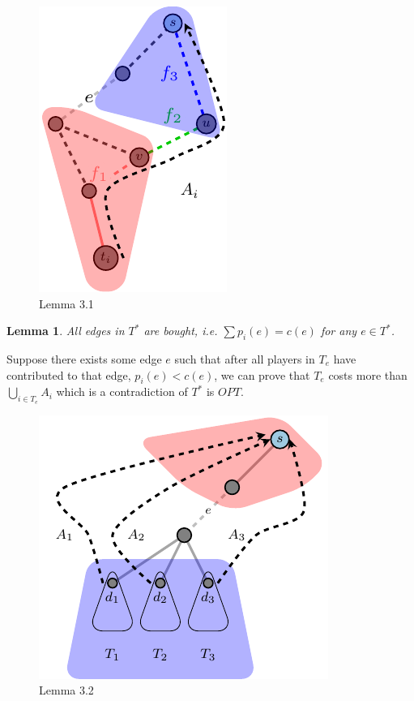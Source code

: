 \documentclass[11pt,psfig,times]{article}
\newtheorem{lemma}{Lemma}[section]
\begin{document}

\begin{figure}[H]
\begin{center}
	\includegraphics{pictures/lemma3.1.pdf}
	\end{center}
	\caption{Lemma 3.1}
	\label{fig:lemma3.1}
\end{figure}
	
	\begin{lemma}
		All edges in \(T^*\) are bought, i.e. $\sum p_i(e) = c(e)$ for any $e \in T^*$.
	\end{lemma}
	Suppose there exists some edge \(e\) such that after all players in \(T_e\) have contributed to that edge, \(p_i(e) < c(e)\), we can prove that \(T_e\) costs more than \(\bigcup_{i\in T_e} A_i\) which is a contradiction of \(T^*\) is \(OPT\).
	
	\begin{figure}[H]
		\begin{center}
		\includegraphics{pictures/lemma3.2.pdf}
		\end{center}
		\caption{Lemma 3.2}
		\label{fig:Lemma3.2}
	\end{figure}
		
\end{document}
